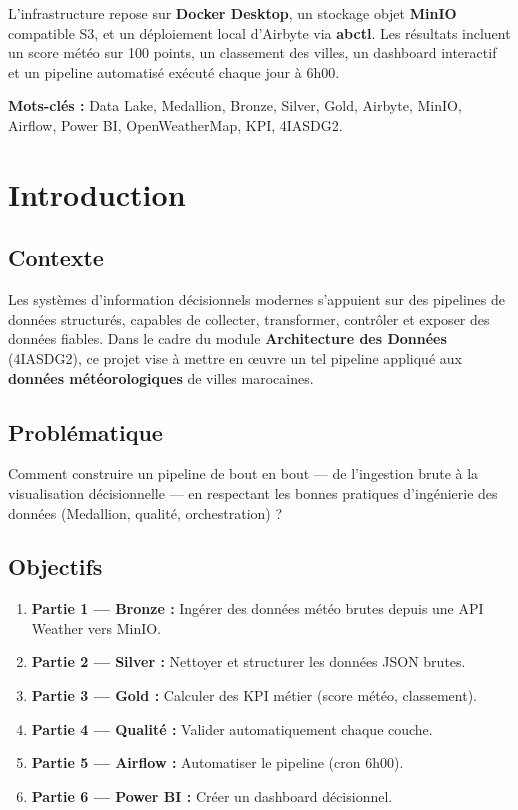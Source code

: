 \documentclass[12pt,a4paper]{report}
\begin{document}
L'infrastructure repose sur \textbf{Docker Desktop}, un stockage objet \textbf{MinIO} compatible S3, et un déploiement local d'Airbyte via \textbf{abctl}. Les résultats incluent un score météo sur 100 points, un classement des villes, un dashboard interactif et un pipeline automatisé exécuté chaque jour à 6h00.

\textbf{Mots-clés :} Data Lake, Medallion, Bronze, Silver, Gold, Airbyte, MinIO, Airflow, Power BI, OpenWeatherMap, KPI, 4IASDG2.

\tableofcontents
\listoffigures
\listoftables
\newpage

\chapter{Introduction}

\section{Contexte}

Les systèmes d'information décisionnels modernes s'appuient sur des pipelines de données structurés, capables de collecter, transformer, contrôler et exposer des données fiables. Dans le cadre du module \textbf{Architecture des Données} (4IASDG2), ce projet vise à mettre en œuvre un tel pipeline appliqué aux \textbf{données météorologiques} de villes marocaines.

\section{Problématique}

Comment construire un pipeline de bout en bout — de l'ingestion brute à la visualisation décisionnelle — en respectant les bonnes pratiques d'ingénierie des données (Medallion, qualité, orchestration) ?

\section{Objectifs}

\begin{enumerate}[leftmargin=1.5cm]
    \item \textbf{Partie 1 — Bronze :} Ingérer des données météo brutes depuis une API Weather vers MinIO.
    \item \textbf{Partie 2 — Silver :} Nettoyer et structurer les données JSON brutes.
    \item \textbf{Partie 3 — Gold :} Calculer des KPI métier (score météo, classement).
    \item \textbf{Partie 4 — Qualité :} Valider automatiquement chaque couche.
    \item \textbf{Partie 5 — Airflow :} Automatiser le pipeline (cron 6h00).
    \item \textbf{Partie 6 — Power BI :} Créer un dashboard décisionnel.
\end{enumerate}
\end{document}
